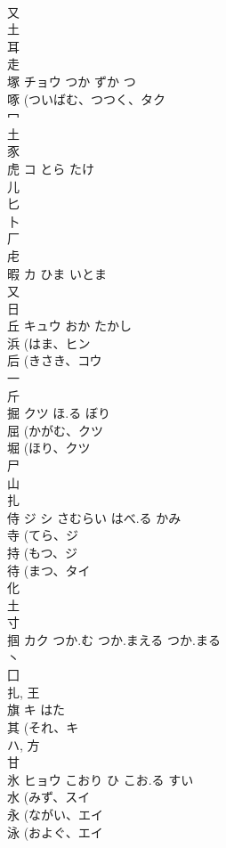\documentclass[8pt]{extreport}
\begin{document}
\begin{CJK}{UTF8}{min}
\\	又 
\\	土 
\\	耳 
\\	走 
\\	塚	チョウ	つか ずか つ	
\\	啄 (ついばむ、つつく、タク 
\\	冖 
\\	土 
\\	豕 
\\	虎	コ	とら たけ	
\\	儿 
\\	匕 
\\	卜 
\\	厂 
\\	虍 
\\	暇	カ	ひま いとま	
\\	又 
\\	日 
\\	丘	キュウ	おか たかし	
\\	浜 (はま、ヒン 
\\	后 (きさき、コウ 
\\	一 
\\	斤 
\\	掘	クツ	ほ.る ぼり	
\\	屈 (かがむ、クツ 
\\	堀 (ほり、クツ 
\\	尸 
\\	山 
\\	扎	
\\	侍	ジ シ	さむらい はべ.る かみ	
\\	寺 (てら、ジ 
\\	持 (もつ、ジ 
\\	待 (まつ、タイ 
\\	化 
\\	土 
\\	寸 
\\	掴	カク	つか.む つか.まえる つか.まる	
\\	丶 
\\	囗 
\\	扎, 王 
\\	旗	キ	はた	
\\	其 (それ、キ 
\\	ハ, 方 
\\	甘 
\\	氷	ヒョウ	こおり ひ こお.る すい	
\\	水 (みず、スイ 
\\	永 (ながい、エイ 
\\	泳 (およぐ、エイ 

\end{CJK}
\end{document}
